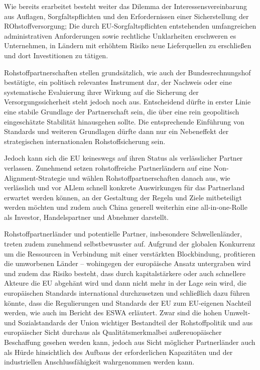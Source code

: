 \documentclass[12pt,a4paper,oneside]{book} %
\begin{document}
Wie bereits erarbeitet besteht weiter das Dilemma der Interessensvereinbarung aus Auflagen, Sorgfaltspflichten und den Erfordernissen einer Sicherstellung der ROhstoffversorgung; Die durch EU‑Sorgfaltspflichten entstehenden umfangreichen administrativen Anforderungen sowie rechtliche Unklarheiten erschweren es Unternehmen, in Ländern mit erhöhtem Risiko neue Lieferquellen zu erschließen und dort Investitionen zu tätigen.

Rohstoffpartnerschaften stellen grundsätzlich, wie auch der Bundesrechnungshof bestätigte, ein politisch relevantes Instrument dar, der Nachweis oder eine systematische Evaluierung ihrer Wirkung auf die Sicherung der Versorgungssicherheit steht jedoch noch aus. Entscheidend dürfte in erster Linie eine stabile Grundlage der Partnerschaft sein, die über eine rein geopolitisch eingeschätzte Stabilität hinausgehen sollte. Die entsprechende Einführung von Standards und weiteren Grundlagen dürfte dann nur ein Nebeneffekt der strategischen internationalen Rohstoffsicherung sein.

Jedoch kann sich die EU keineswegs auf ihren Status als verlässlicher Partner verlassen. Zunehmend setzen rohstoffreiche Partnerländern auf eine Non-Alignment-Strategie und wählen Rohstoffpartnerschaften danach aus, wie verlässlich und vor ALlem schnell konkrete Auswirkungen für das Partnerland erwartet werden können, an der Gestaltung der Regeln und Ziele mitbeteiligt werden möchten und zudem auch China generell weiterhin eine all-in-one-Rolle als Investor, Handelspartner und Abnehmer darstellt.\autocite{KAS: Vom Dialog zur Lieferkette, S. 37}

Rohstoffpartnerländer und potentielle Partner, insbesondere Schwellenländer, treten zudem zunehmend selbstbewusster auf. Aufgrund der globalen Konkurrenz um die Ressourcen in Verbindung mit einer verstärkten Blockbindung, profitieren die umworbenen Länder -- wohingegen der europäische Ansatz untergraben wird und zudem das Risiko besteht, dass durch kapitalstärkere oder auch schnellere Akteure die EU abgehänt wird und dann nicht mehr in der Lage sein wird, die europäischen Standards international durchzusetzen und schließlich dazu führen könnte, dass die Regulierungen und Standards der EU zum EU-eigenen Nachteil werden,\autocite{Frenz 2025, S. 1102} wie auch im Bericht des ESWA erläutert.\autocite{EESC 2023/01573} Zwar sind die hohen Umwelt- und Sozialstandards der Union wichtiger Bestandteil der Rohstoffpolitik und aus europäischer Sicht durchaus als \glqq Qualitätsmerkmal\grqq bei außereuopäischer Beschaffung gesehen werden kann, jedoch aus Sicht möglicher Partnerländer auch als Hürde hinsichtlich des Aufbaus der erforderlichen Kapazitäten und der industriellen Anschlussfähigkeit wahrgenommen werden kann.\autocite{KAS: Vom Dialog zur Lieferkette, S. 35}
\end{document}
